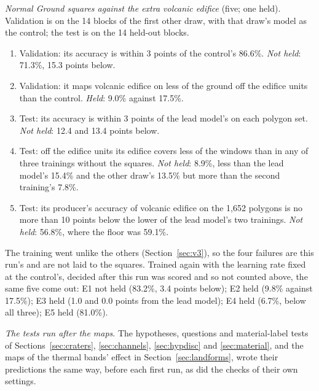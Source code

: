 \documentclass[twocolumn]{aastex701}
\begin{document}
\emph{Normal Ground squares against the extra volcanic edifice} (five; one held). Validation is on the 14 blocks of
the first other draw, with that draw's model as the control; the test is on the 14 held-out blocks.
\begin{enumerate}
\item[E1] Validation: its accuracy is within 3 points of the control's 86.6\%. \emph{Not held}: 71.3\%, 15.3 points
below.
\item[E2] Validation: it maps volcanic edifice on less of the ground off the edifice units than the control.
\emph{Held}: 9.0\% against 17.5\%.
\item[E3] Test: its accuracy is within 3 points of the lead model's on each polygon set. \emph{Not held}: 12.4 and
13.4 points below.
\item[E4] Test: off the edifice units its edifice covers less of the windows than in any of three trainings without
the squares. \emph{Not held}: 8.9\%, less than the lead model's 15.4\% and the other draw's 13.5\% but more than the
second training's 7.8\%.
\item[E5] Test: its producer's accuracy of volcanic edifice on the 1,652 polygons is no more than 10 points below
the lower of the lead model's two trainings. \emph{Not held}: 56.8\%, where the floor was 59.1\%.
\end{enumerate}
The training went unlike the others (Section~\ref{sec:v3}), so the four failures are this run's and are not laid to
the squares. Trained again with the learning rate fixed at the control's, decided after this run was scored and so
not counted above, the same five come out: E1 not held (83.2\%, 3.4 points below); E2 held (9.8\% against 17.5\%);
E3 held (1.0 and 0.0 points from the lead model); E4 held (6.7\%, below all three); E5 held (81.0\%).

\emph{The tests run after the maps}. The hypotheses, questions and material-label tests of
Sections~\ref{sec:craters}, \ref{sec:channels}, \ref{sec:hypdisc} and \ref{sec:material}, and the maps of the thermal
bands' effect in Section~\ref{sec:landforms}, wrote their predictions the same way, before each first run, as did the
checks of their own settings. %
\end{document}
